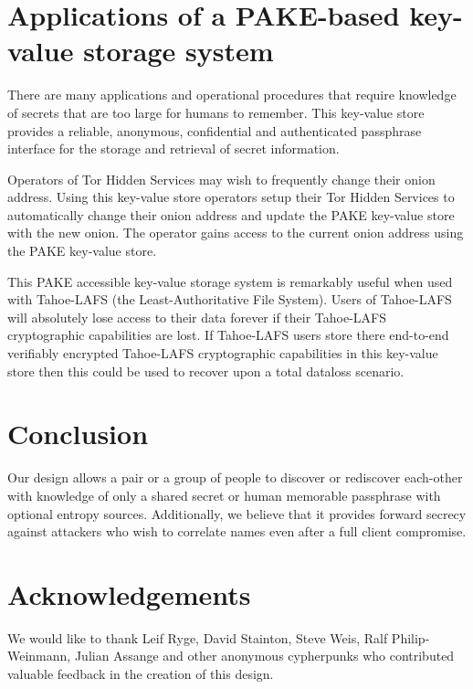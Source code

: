 \documentclass[letterpaper,twocolumn,10pt]{article}
\begin{document}
\section{Applications of a PAKE-based key-value storage system}

There are many applications and operational procedures that require knowledge of secrets that are too
large for humans to remember. This key-value store provides a reliable, anonymous, confidential
and authenticated passphrase interface for the storage and retrieval of secret information.

Operators of Tor Hidden Services may wish to frequently change their onion address.
Using this key-value store operators setup their Tor Hidden Services to automatically change their
onion address and update the PAKE key-value store with the new onion. The operator gains access
to the current onion address using the PAKE key-value store.

This PAKE accessible key-value storage system is remarkably useful when used with Tahoe-LAFS (the Least-Authoritative File System).
Users of Tahoe-LAFS will absolutely lose access to their data forever if their Tahoe-LAFS cryptographic capabilities are lost.
If Tahoe-LAFS users store there end-to-end verifiably encrypted Tahoe-LAFS cryptographic capabilities in this
key-value store then this could be used to recover upon a total dataloss scenario.


\section{Conclusion}

Our design allows a pair or a group of people to discover or rediscover
each-other with knowledge of only a shared secret or human memorable
passphrase with optional entropy sources. Additionally, we believe that it
provides forward secrecy against attackers who wish to correlate names even
after a full client compromise.

\section*{Acknowledgements}

We would like to thank Leif Ryge, David Stainton, Steve Weis, Ralf Philip-Weinmann, Julian
Assange and other anonymous cypherpunks who contributed valuable feedback in
the creation of this design.

{\footnotesize 
}
\end{document}
